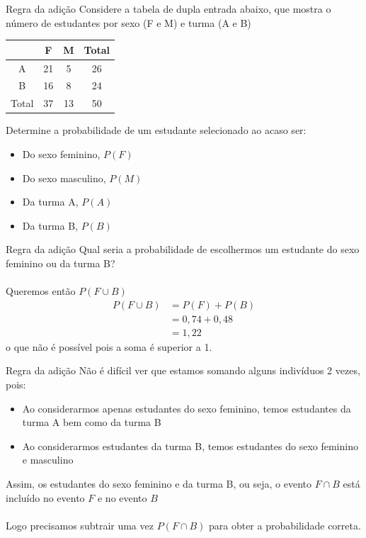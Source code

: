 \documentclass[10pt]{beamer}\usepackage[]{graphicx}\usepackage[]{color}
\theoremstyle{definition}
\begin{document}
\begin{frame}[fragile]{Regra da adição}
  Considere a tabela de dupla entrada abaixo, que mostra o número de
  estudantes por sexo (F e M) e turma (A e B)
  \begin{table}
    \centering
    \begin{tabular}{c|cc|c}
      \hline
      & F & M & Total \\
      \hline
      A & 21 & 5 & 26 \\
      B & 16 & 8 & 24 \\
      \hline
      Total & 37 & 13 & 50 \\
      \hline
    \end{tabular}
  \end{table}
  Determine a probabilidade de um estudante selecionado ao acaso ser:
  \begin{itemize}
  \item Do sexo feminino, $P(F)$
  \item Do sexo masculino, $P(M)$
  \item Da turma A, $P(A)$
  \item Da turma B, $P(B)$
  \end{itemize}
\end{frame}

\begin{frame}[fragile]{Regra da adição}
  Qual seria a probabilidade de escolhermos um estudante do sexo
  feminino ou da turma B? \\~\\ \pause
  Queremos então $P(F \cup B)$
  \begin{align*}
    P(F \cup B) &= P(F) + P(B) \\
    &= 0,74 + 0,48 \\
    &= 1,22
  \end{align*}
  o que não é possível pois a soma é superior a 1.
\end{frame}

\begin{frame}[fragile]{Regra da adição}
  Não é difícil ver que estamos somando alguns indivíduos 2 vezes, pois:
  \begin{itemize}
  \item Ao considerarmos apenas estudantes do sexo feminino, temos
    estudantes da turma A bem como da turma B
  \item Ao considerarmos estudantes da turma B, temos estudantes do sexo
    feminino e masculino
  \end{itemize}
  \vspace{1em}
  Assim, os estudantes do sexo feminino e da turma B, ou seja, o evento
  $F \cap B$ está incluído no evento $F$ e no evento $B$ \\~\\
  Logo precisamos subtrair uma vez $P(F \cap B)$ para obter a
  probabilidade correta.
\end{frame}
\end{document}
